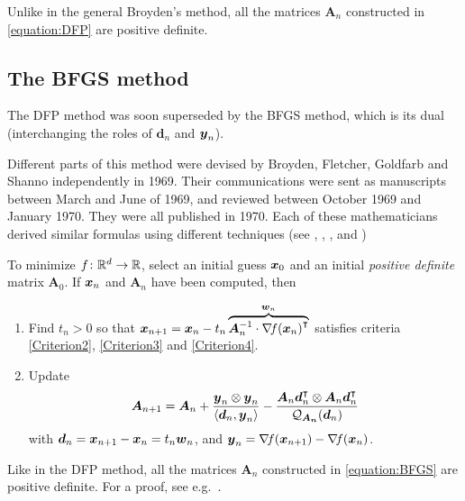 \begin{remark}
Unlike in the general Broyden's method, all the matrices $\boldsymbol{A}_n$ constructed in \eqref{equation:DFP} are positive definite. 
\end{remark}

\subsection{The BFGS method}
The DFP method was soon superseded by the BFGS method, which is its dual (interchanging the roles of $\boldsymbol{d}_n$ and $\boldsymbol{y}_n$).

Different parts of this method were devised by Broyden, Fletcher, Goldfarb and Shanno independently in 1969.  Their communications were sent as manuscripts between March and June of 1969, and reviewed between October 1969 and January 1970.  They were all published in 1970.  Each of these mathematicians derived similar formulas using different techniques (see \cite{broyden1970convergence}, \cite{fletcher1970new}, \cite{goldfarb1970family}, \cite{shanno1970conditioning} and \cite{shanno1970optimal})

To minimize $f \colon \mathbb{R}^d \to \mathbb{R}$, select an initial guess $\boldsymbol{x}_0$ and an initial \emph{positive definite} matrix $\boldsymbol{A}_0$.  If $\boldsymbol{x}_n$ and $\boldsymbol{A}_n$ have been computed, then
\begin{enumerate}
	\item Find $t_n>0$ so that $\boldsymbol{x}_{n+1} = \boldsymbol{x}_n - t_n \overbrace{\boldsymbol{A}_n^{-1} \cdot {\mathop{\nabla\! {f}}(\boldsymbol{x}_n)}^\intercal}^{\boldsymbol{w}_n}$ satisfies criteria \eqref{Criterion2}, \eqref{Criterion3} and \eqref{Criterion4}.
	\item Update
	\begin{equation}\label{equation:BFGS}
	\boldsymbol{A}_{n+1} = \boldsymbol{A}_n + \frac{\boldsymbol{y}_n \otimes \boldsymbol{y}_n}{\langle \boldsymbol{d}_n, \boldsymbol{y}_n \rangle } - \frac{\boldsymbol{A}_n {\boldsymbol{d}}^\intercal_n \otimes \boldsymbol{A}_n {\boldsymbol{d}}^\intercal_n }{\mathcal{Q}_{\boldsymbol{A_n}} (\boldsymbol{d}_n) }
	\end{equation}
	with $\boldsymbol{d}_n = \boldsymbol{x}_{n+1}-\boldsymbol{x}_n= t_n\boldsymbol{w}_n$, and $\boldsymbol{y}_n = \mathop{\nabla\! {f}}(\boldsymbol{x}_{n+1}) - \mathop{\nabla\! {f}}(\boldsymbol{x}_n)$.
\end{enumerate}

\begin{remark}
Like in the DFP method, all the matrices $\boldsymbol{A}_n$ constructed in \eqref{equation:BFGS} are positive definite.  For a proof, see e.g.~\cite[Theorem 3.5.2]{peressini1988mathematics}.
\end{remark}


